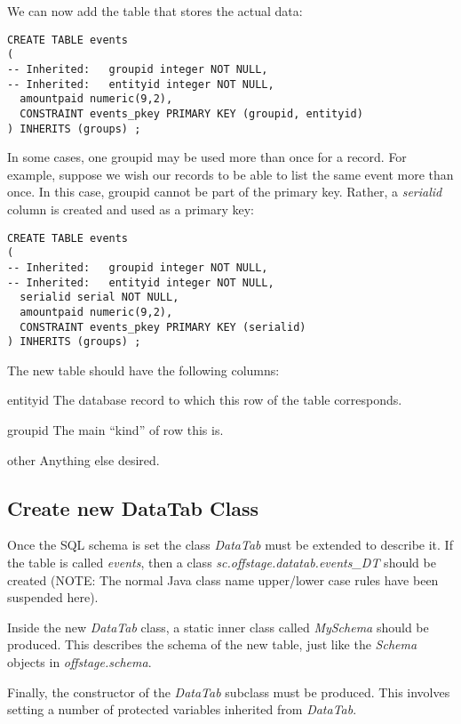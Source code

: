 \documentclass[11pt]{article}
\begin{document}
We can now add the table that stores the actual data:
\begin{verbatim}
CREATE TABLE events
(
-- Inherited:   groupid integer NOT NULL,
-- Inherited:   entityid integer NOT NULL,
  amountpaid numeric(9,2),
  CONSTRAINT events_pkey PRIMARY KEY (groupid, entityid)
) INHERITS (groups) ;
\end{verbatim}

In some cases, one groupid may be used more than once for a record.  For example, suppose we wish our records to be able to list the same event more than once.  In this case, groupid cannot be part of the primary key.  Rather, a \emph{serialid} column is created and used as a primary key:

\begin{verbatim}
CREATE TABLE events
(
-- Inherited:   groupid integer NOT NULL,
-- Inherited:   entityid integer NOT NULL,
  serialid serial NOT NULL,
  amountpaid numeric(9,2),
  CONSTRAINT events_pkey PRIMARY KEY (serialid)
) INHERITS (groups) ;
\end{verbatim}




The new table should have the following columns:
 \begin{description}
\item{entityid} The database record to which this row of the table corresponds.
\item{groupid} The main ``kind'' of row this is.
\item{other} Anything else desired.
 \end{description}

\subsection{Create new DataTab Class}

Once the SQL schema is set the class \emph{DataTab} must be extended to describe it.  If the table is called \emph{events}, then a class \emph{sc.offstage.datatab.events_DT} should be created (NOTE: The normal Java class name upper/lower case rules have been suspended here).

Inside the new \emph{DataTab} class, a static inner class called \emph{MySchema} should be produced.  This describes the schema of the new table, just like the \emph{Schema} objects in \emph{offstage.schema}.

Finally, the constructor of the \emph{DataTab} subclass must be produced.  This involves setting a number of protected variables inherited from \emph{DataTab}.
\end{document}
